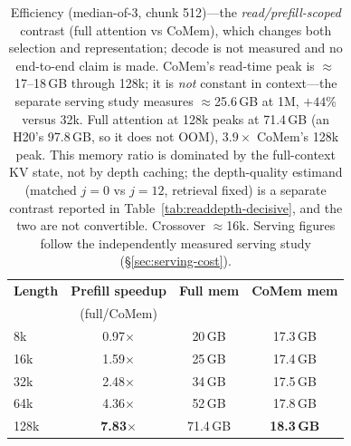 \begin{table}[t]
\centering
\small
\begin{tabular}{@{}lccc@{}}
\toprule
\textbf{Length} & \textbf{Prefill speedup} & \textbf{Full mem} & \textbf{CoMem mem} \\
 & (full/CoMem) & & \\
\midrule
8k & 0.97$\times$ & 20\,GB & 17.3\,GB \\
16k & 1.59$\times$ & 25\,GB & 17.4\,GB \\
32k & 2.48$\times$ & 34\,GB & 17.5\,GB \\
64k & 4.36$\times$ & 52\,GB & 17.8\,GB \\
128k & \textbf{7.83}$\times$ & 71.4\,GB & \textbf{18.3\,GB} \\
\bottomrule
\end{tabular}
\caption{Efficiency (median-of-3, chunk 512)---the \emph{read/prefill-scoped}
contrast (full attention vs CoMem), which changes both selection and
representation; decode is not measured and no end-to-end claim is made.
CoMem's read-time peak is $\approx$17--18\,GB through 128k; it is \emph{not}
constant in context---the separate serving study measures $\approx$25.6\,GB at
1M, $+44$\% versus 32k.  Full attention at 128k peaks at 71.4\,GB (an H20's
97.8\,GB, so it does not OOM), $3.9\times$ CoMem's 128k peak.  This memory
ratio is dominated by the full-context KV state, not by depth caching; the
depth-quality estimand (matched $j{=}0$ vs $j{=}12$, retrieval fixed) is a
separate contrast reported in Table~\ref{tab:readdepth-decisive}, and the two
are not convertible.  Crossover $\approx$16k.  Serving figures follow the
independently measured serving study (\S\ref{sec:serving-cost}).}
\label{tab:eff}
\end{table}
